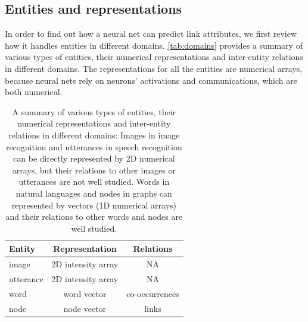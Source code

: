 \documentclass[twocolumn]{article}
\begin{document}
\subsection{Entities and representations}
In order to find out how a neural net can predict link attributes, we first 
review how it handles entities in different domains.
\autoref{tab:domains} provides a summary of various types of entities, their 
numerical representations and inter-entity relations in different domains.
The representations for all the entities are numerical arrays, 
because neural nets rely on neurons' activations and communications, which 
are both numerical.
\begin{table}[h]
	\centering
	\caption{A summary of various types of entities, their numerical
		representations and inter-entity relations in different domains:
		Images in image recognition and utterances in speech recognition can be 
		directly represented by 2D numerical arrays, 
		but their relations to other images or utterances are not well studied. 
		Words in natural languages and nodes in graphs can represented by 
		vectors (1D numerical arrays) and their relations to other words and 
		nodes are well studied.}
	\begin{tabularx}{0.5\textwidth}{|X|c|c| }  \hline
 \textbf{Entity} & \textbf{Representation} & \textbf{Relations} \\ \hline
	 image & 2D intensity array & NA \\ \hline
	 utterance & 2D intensity array & NA \\ \hline
	 word & word vector & co-occurrences \\ \hline
	 node & node vector & links \\ \hline
	\end{tabularx}
	\label{tab:domains}
\end{table}
\end{document}
